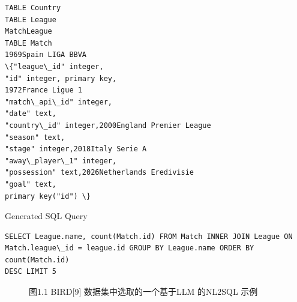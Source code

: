 \documentclass[12pt,a4paper,openright,UTF8]{ctexbook}
\begin{document}
\begin{lstlisting}
TABLE Country
TABLE League
MatchLeague
TABLE Match
1969Spain LIGA BBVA
\{"league\_id" integer,
"id" integer, primary key,
1972France Ligue 1
"match\_api\_id" integer,
"date" text,
"country\_id" integer,2000England Premier League
"season" text,
"stage" integer,2018Italy Serie A
"away\_player\_1" integer,
"possession" text,2026Netherlands Eredivisie
"goal" text,
primary key("id") \}
\end{lstlisting}
Generated SQL Query

\begin{lstlisting}
SELECT League.name, count(Match.id) FROM Match INNER JOIN League ON
Match.league\_id = league.id GROUP BY League.name ORDER BY count(Match.id)
DESC LIMIT 5
\end{lstlisting}

\begin{figure}[htbp]
\centering
{}
\caption{图1.1 BIRD[9] 数据集中选取的一个基于LLM 的NL2SQL 示例}
\end{figure}
\end{document}

